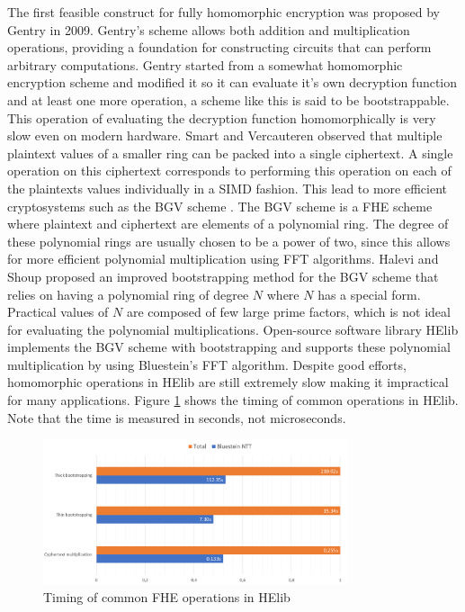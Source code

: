 \documentclass[english,master=eelt,masteroption=ec]{kulemt}
\begin{document}
The first feasible construct for fully homomorphic encryption was proposed by Gentry in 2009. \cite{10.1145/1536414.1536440} Gentry's scheme allows both addition and multiplication operations, providing a foundation for constructing circuits that can perform arbitrary computations. Gentry started from a somewhat homomorphic encryption scheme and modified it so it can evaluate it's own decryption function and at least one more operation, a scheme like this is said to be bootstrappable. This operation of evaluating the decryption function homomorphically is very slow even on modern hardware. Smart and Vercauteren \cite{FHEsimd} observed that multiple plaintext values of a smaller ring can be packed into a single ciphertext. A single operation on this ciphertext corresponds to performing this operation on each of the plaintexts values individually in a SIMD fashion. This lead to more efficient cryptosystems such as the BGV scheme \cite{BGV}. The BGV scheme is a FHE scheme where plaintext and ciphertext are elements of a polynomial ring. The degree of these polynomial rings are usually chosen to be a power of two, since this allows for more efficient polynomial multiplication using FFT algorithms. Halevi and Shoup \cite{cryptoeprint:2014/873} proposed an improved bootstrapping method for the BGV scheme that relies on having a polynomial ring of degree $N$ where $N$ has a special form. Practical values of $N$ are composed of few large prime factors, which is not ideal for evaluating the polynomial multiplications. Open-source software library HElib implements the BGV scheme with bootstrapping and supports these polynomial multiplication by using Bluestein's FFT algorithm. \cite{helib} Despite good efforts, homomorphic operations in HElib are still extremely slow making it impractical for many applications. Figure \ref{fig:helib_timing} shows the timing of common operations in HElib. Note that the time is measured in seconds, not microseconds.

\begin{figure}[h]
\centering
\includegraphics[width=0.8\textwidth]{img/HElib.png}
\caption{Timing of common FHE operations in HElib}
\label{fig:helib_timing}
\end{figure}
\end{document}
